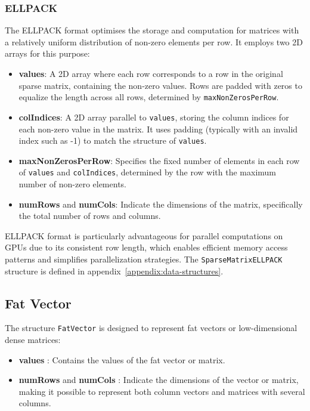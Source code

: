 \documentclass[12pt,oneside]{book} %
\begin{document}
\subsubsection{ELLPACK }
The ELLPACK format optimises the storage and computation for matrices with a
relatively uniform distribution of non-zero elements per row. It employs two 2D
arrays for this purpose:

\begin{itemize}
    \item \textbf{values}: A 2D array where each row corresponds to a row in the original sparse matrix, containing the non-zero values. Rows are padded with zeros to equalize the length across all rows, determined by \texttt{maxNonZerosPerRow}.
    \item \textbf{colIndices}: A 2D array parallel to \texttt{values}, storing the column indices for each non-zero value in the matrix. It uses padding (typically with an invalid index such as -1) to match the structure of \texttt{values}.
    \item \textbf{maxNonZerosPerRow}: Specifies the fixed number of elements in each row of \texttt{values} and \texttt{colIndices}, determined by the row with the maximum number of non-zero elements.
    \item \textbf{numRows} and \textbf{numCols}: Indicate the dimensions of the matrix, specifically the total number of rows and columns.
\end{itemize}

ELLPACK format is particularly advantageous for parallel computations on GPUs
due to its consistent row length, which enables efficient memory access
patterns and simplifies parallelization strategies. The
\texttt{SparseMatrixELLPACK} structure is defined in
appendix~\ref{appendix:data-structures}.

\subsection{Fat Vector}
The structure \texttt{FatVector} is designed to represent fat vectors or
low-dimensional dense matrices:

\begin{itemize}
    \item \textbf{values} : Contains the values of the fat vector or matrix.
    \item \textbf{numRows} and \textbf{numCols} : Indicate the dimensions of the vector or matrix, making it possible to represent both column vectors and matrices with several columns.
\end{itemize}
\end{document}
